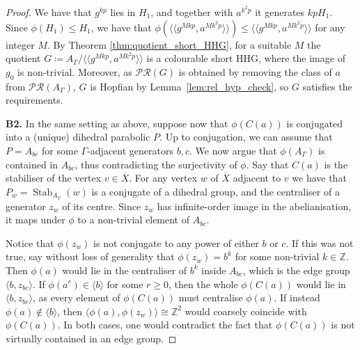 \documentclass[svgnames]{amsart}
\theoremstyle{plain}
\theoremstyle{definition}
\newcommand{\Z}{\mathbb{Z}}
\newcommand{\ov}[1]{\overline{#1}}
\newcommand{\Stab}[2]{\operatorname{Stab}_{#1}(#2)}
\begin{document}
\begin{proof}
 We have that $g^{kp}$ lies in $H_1$, and together with $a^{k^2p}$ it generates $kpH_1$. Since $\phi(H_1)\le H_1$, we have that $\phi(\langle\langle g^{Mkp},a^{Mk^2p}\rangle\rangle)\le \langle\langle g^{Mkp},a^{Mk^2p}\rangle\rangle$ for any integer $M$. By Theorem \ref{thm:quotient_short_HHG}, for a suitable $M$ the quotient $G\coloneq A_\Gamma/\langle\langle g^{Mkp},a^{Mk^2p}\rangle\rangle$ is a colourable short HHG, where the image of $g_0$ is non-trivial. Moreover, as $\mathcal{PR}(G)$ is obtained by removing the class of $a$ from $\mathcal{PR}(A_\Gamma)$, $G$ is Hopfian by Lemma~\ref{lem:rel_hyp_check}, so $G$ satisfies the requirements.
   \par\medskip
\textbf{B2.}
In the same setting as above, suppose now that $\phi(C(a))$ is conjugated into a (unique) dihedral parabolic $P$. Up to conjugation, we can assume that $P=A_{bc}$ for some $\Gamma$-adjacent generators $b,c$. We now argue that $\phi(A_\Gamma)$ is contained in $A_{bc}$, thus contradicting the surjectivity of $\phi$. Say that $C(a)$ is the stabiliser of the vertex $v\in \ov{X}$. For any vertex $w$ of $\ov{X}$ adjacent to $v$ we have that $P_w=\Stab{A_\Gamma}{w}$ is a conjugate of a dihedral group, and the centraliser of a generator $z_w$ of its centre. Since $z_w$ has infinite-order image in the abelianisation, it maps under $\phi$ to a non-trivial element of $A_{bc}$.

Notice that $\phi(z_w)$ is not conjugate to any power of either $b$ or $c$. If this was not true, say without loss of generality that $\phi(z_w)=b^k$ for some non-trivial $k\in\mathbb{Z}$. Then $\phi(a)$ would lie in the centraliser of $b^k$ inside $A_{bc}$, which is the edge group $\langle b, z_{bc}\rangle$. If $\phi(a^r)\in \langle b\rangle$ for some $r\ge 0$, then the whole $\phi(C(a))$ would lie in $\langle b, z_{bc}\rangle$, as every element of $\phi(C(a))$ must centralise $\phi(a)$. If instead $\phi(a)\not\in\langle b\rangle$, then $\langle \phi(a), \phi(z_w)\rangle\cong \Z^2$ would coarsely coincide with $\phi(C(a))$. In both cases, one would contradict the fact that $\phi(C(a))$ is not virtually contained in an edge group. 


\end{proof}
\end{document}

